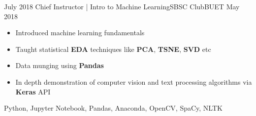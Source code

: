 %
%
%


\begin{experiences}
  \experience
    {July 2018}   {Chief Instructor | Intro to Machine Learning}{SBSC Club}{BUET}
    {May 2018} {
                      \begin{itemize}
                        \item Introduced machine learning fundamentals                         
                        \item Taught statistical \textbf{EDA} techniques like \textbf{PCA}, \textbf{TSNE}, \textbf{SVD} etc         
                        \item Data munging using \textbf{Pandas}                
                        \item In depth demonstration of computer vision and text processing algorithms via \textbf{Keras} API  \\                                                                   
                      \end{itemize}
                    }
                    {Python, Jupyter Notebook, Pandas, Anaconda, OpenCV, SpaCy, NLTK}
  \emptySeparator
\end{experiences}